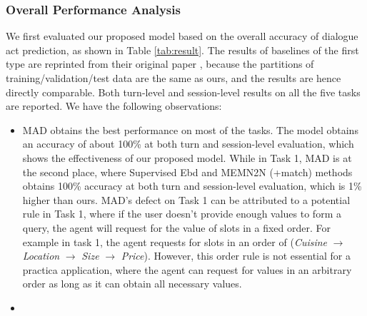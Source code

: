 \subsubsection{Overall Performance Analysis} 



We first evaluated our proposed model based on the overall accuracy of dialogue act prediction, as shown in Table \ref{tab:result}. The results of baselines of the first type are reprinted from their original paper \cite{bordes2016learning}, because the partitions of training/validation/test data are the same as ours, and the results are hence directly comparable. Both turn-level and session-level results on all the five tasks are reported. 
We have the following observations:
\begin{itemize}
    \item 
    MAD obtains the best performance on most of the tasks. The model obtains an accuracy of about 100\% at both turn and session-level evaluation, which shows the effectiveness of our proposed model. While in Task 1, MAD is at the second place, where Supervised Ebd and MEMN2N (+match) methods obtains 100\% accuracy at both turn and session-level evaluation, which is 1\% higher than ours. MAD's defect on Task 1 can be attributed to a potential rule in Task 1, where if the user doesn't provide enough values to form a query, the agent will request for the value of slots in a fixed order. For example in task 1, the agent requests for slots in an order of ({\em Cuisine} $\rightarrow$ {\em Location} $\rightarrow$ {\em Size} $\rightarrow$ {\em Price}). However, this order rule is not essential for a practica application, where the agent can request for values in an arbitrary order as long as it can obtain all necessary values.

    \item

\end{itemize}


